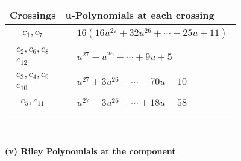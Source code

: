 \documentclass[1p]{elsarticle_modified}
\theoremstyle{definition}
\begin{document}
\begin{tabular}{m{50pt}|m{274pt}}
Crossings & \hspace{64pt}u-Polynomials at each crossing \\
\hline $$\begin{aligned}c_{1},c_{7}\end{aligned}$$&$\begin{aligned}
&16(16 u^{27}+32 u^{26}+\cdots+25 u+11)
\end{aligned}$\\
\hline $$\begin{aligned}c_{2},c_{6},c_{8}\\c_{12}\end{aligned}$$&$\begin{aligned}
&u^{27}- u^{26}+\cdots+9 u+5
\end{aligned}$\\
\hline $$\begin{aligned}c_{3},c_{4},c_{9}\\c_{10}\end{aligned}$$&$\begin{aligned}
&u^{27}+3 u^{26}+\cdots-70 u-10
\end{aligned}$\\
\hline $$\begin{aligned}c_{5},c_{11}\end{aligned}$$&$\begin{aligned}
&u^{27}-3 u^{26}+\cdots+18 u-58
\end{aligned}$\\
\hline
\end{tabular}\\~\\
\newpage\renewcommand{\arraystretch}{1}
\flushleft \textbf{(v) Riley Polynomials at the component}\newline \\
\end{document}
